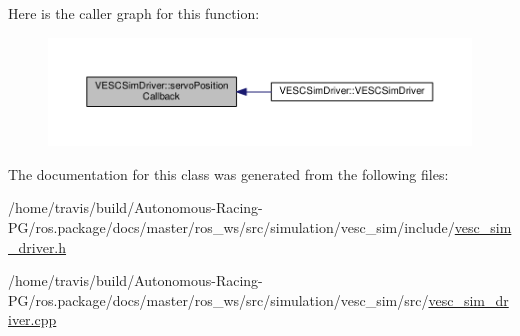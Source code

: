 Here is the caller graph for this function\+:
\nopagebreak
\begin{figure}[H]
\begin{center}
\leavevmode
\includegraphics[width=350pt]{class_v_e_s_c_sim_driver_ae40a1445ec27ea21923f011b594f6ef3_icgraph}
\end{center}
\end{figure}




The documentation for this class was generated from the following files\+:\begin{DoxyCompactItemize}
\item 
/home/travis/build/\+Autonomous-\/\+Racing-\/\+P\+G/ros.\+package/docs/master/ros\+\_\+ws/src/simulation/vesc\+\_\+sim/include/\hyperlink{vesc__sim__driver_8h}{vesc\+\_\+sim\+\_\+driver.\+h}\item 
/home/travis/build/\+Autonomous-\/\+Racing-\/\+P\+G/ros.\+package/docs/master/ros\+\_\+ws/src/simulation/vesc\+\_\+sim/src/\hyperlink{vesc__sim__driver_8cpp}{vesc\+\_\+sim\+\_\+driver.\+cpp}\end{DoxyCompactItemize}
